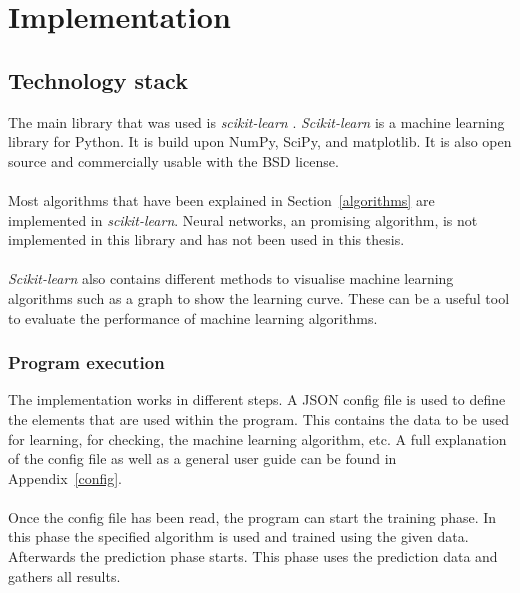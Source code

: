 
\chapter{Implementation} %

\label{implementation} %

\section{Technology stack}
\label{technology}
The main library that was used is \textit{scikit-learn} \cite{scikit-learn}. \textit{Scikit-learn} is a machine learning library for Python. It is build upon NumPy, SciPy, and matplotlib. It is also open source and commercially usable with the BSD license. \\
\\
Most algorithms that have been explained in Section~\ref{algorithms} are implemented in \textit{scikit-learn}. Neural networks, an promising algorithm, is not implemented in this library and has not been used in this thesis. \\
\\
\textit{Scikit-learn} also contains different methods to visualise machine learning algorithms such as a graph to show the learning curve. These can be a useful tool to evaluate the performance of machine learning algorithms.

\subsection{Program execution}
The implementation works in different steps. A JSON config file is used to define the elements that are used within the program. This contains the data to be used for learning, for checking, the machine learning algorithm, etc. A full explanation of the config file as well as a general user guide can be found in Appendix~\ref{config}. \\
\\
Once the config file has been read, the program can start the training phase. In this phase the specified algorithm is used and trained using the given data. Afterwards the prediction phase starts.  This phase uses the prediction data and gathers all results. 

